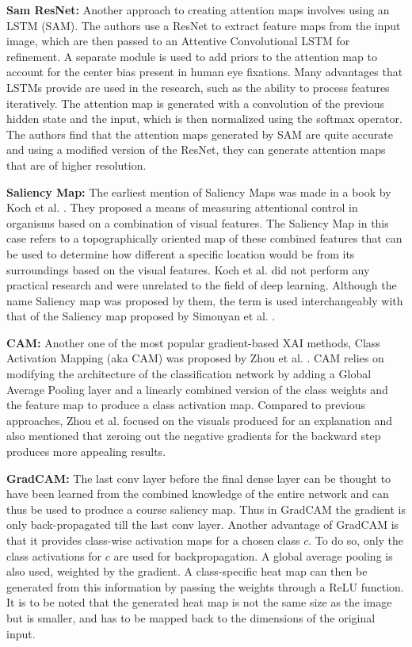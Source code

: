 \textbf{Sam ResNet: }
Another approach to creating attention maps involves using an LSTM \cite{corniaPredictingHumanEye2018} (SAM). The authors use a ResNet to extract feature maps from the input image, which are then passed to an Attentive Convolutional LSTM for refinement. A separate module is used to add priors to the attention map to account for the center bias present in human eye fixations. Many advantages that LSTMs provide are used in the research, such as the ability to process features iteratively. The attention map is generated with a convolution of the previous hidden state and the input, which is then normalized using the softmax operator. The authors find that the attention maps generated by SAM are quite accurate and using a modified version of the ResNet, they can generate attention maps that are of higher resolution.

\textbf{Saliency Map: } The earliest mention of Saliency Maps was made in a book by Koch et al. \cite{ullman1988attention}. They proposed a means of measuring attentional control in organisms based on a combination of visual features. The Saliency Map in this case refers to a topographically oriented map of these combined features that can be used to determine how different a specific location would be from its surroundings based on the visual features. Koch et al. did not perform any practical research and were unrelated to the field of deep learning. Although the name Saliency map was proposed by them, the term is used interchangeably with that of the Saliency map proposed by Simonyan et al. \cite{simonyanDeepConvolutionalNetworks2014}.

\textbf{CAM: } Another one of the most popular gradient-based XAI methods, Class Activation Mapping (aka CAM) was proposed by Zhou et al. \cite{zhouLearningDeepFeatures2016}. CAM relies on modifying the architecture of the classification network by adding a Global Average Pooling layer and a linearly combined version of the class weights and the feature map to produce a class activation map. Compared to previous approaches, Zhou et al. focused on the visuals produced for an explanation and also mentioned that zeroing out the negative gradients for the backward step produces more appealing results.

\textbf{GradCAM: } The last conv layer before the final dense layer can be thought to have been learned from the combined knowledge of the entire network and can thus be used to produce a course saliency map. Thus in GradCAM \cite{selvarajuGradCAMVisualExplanations} the gradient is only back-propagated till the last conv layer. Another advantage of GradCAM is that it provides class-wise activation maps for a chosen class $c$. To do so, only the class activations for $c$ are used for backpropagation. A global average pooling is also used, weighted by the gradient. A class-specific heat map can then be generated from this information by passing the weights through a ReLU function. It is to be noted that the generated heat map is not the same size as the image but is smaller, and has to be mapped back to the dimensions of the original input.

